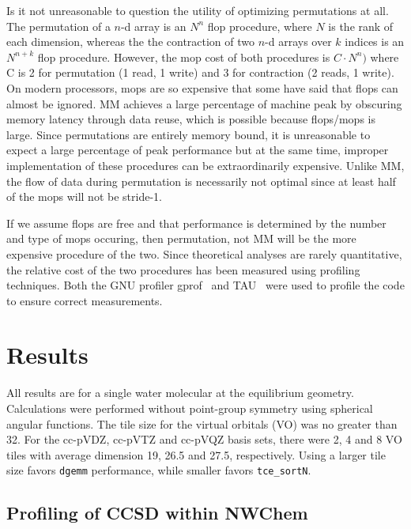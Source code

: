 \documentclass[aps,preprint,groupedaddress]{revtex4-1}
\begin{document}
Is it not unreasonable to question the utility of optimizing permutations at all.  The permutation of a $n$-d array is an $N^n$ flop procedure, where $N$ is the rank of each dimension, whereas the the contraction of two $n$-d arrays over $k$ indices is an $N^{n+k}$ flop procedure.  However, the mop cost of both procedures is $C \cdot N^n)$ where C is 2 for permutation (1 read, 1 write) and 3 for contraction (2 reads, 1 write).  On modern processors, mops are so expensive that some have said that flops can almost be ignored.  MM achieves a large percentage of machine peak by obscuring memory latency through data reuse, which is possible because flops/mops is large.  Since permutations are entirely memory bound, it is unreasonable to expect a large percentage of peak performance but at the same time, improper implementation of these procedures can be extraordinarily expensive.  Unlike MM, the flow of data during permutation is necessarily not optimal since at least half of the mops will not be stride-1.

If we assume flops are free and that performance is determined by the number and type of mops occuring, then permutation, not MM will be the more expensive procedure of the two.  Since theoretical analyses are rarely quantitative, the relative cost of the two procedures has been measured using profiling techniques.  Both the GNU profiler gprof~\cite{GPROF} and TAU~\cite{TAU} were used to profile the code to ensure correct measurements.

\section{Results}

All results are for a single water molecular at the equilibrium geometry.  Calculations were performed without point-group symmetry using spherical angular functions.  The tile size for the virtual orbitals (VO) was no greater than 32.  For the cc-pVDZ, cc-pVTZ and cc-pVQZ basis sets, there were 2, 4 and 8 VO tiles with average dimension 19, 26.5 and 27.5, respectively.  Using a larger tile size favors \texttt{dgemm} performance, while smaller favors \texttt{tce\_sortN}.

\subsection{Profiling of CCSD within NWChem}
\end{document}
